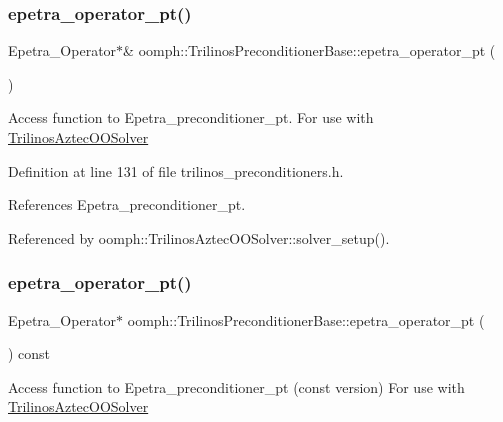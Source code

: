 \subsubsection{\texorpdfstring{epetra\+\_\+operator\+\_\+pt()}{epetra\_operator\_pt()}\hspace{0.1cm}{\footnotesize\ttfamily [1/2]}}
{\footnotesize\ttfamily Epetra\+\_\+\+Operator$\ast$\& oomph\+::\+Trilinos\+Preconditioner\+Base\+::epetra\+\_\+operator\+\_\+pt (\begin{DoxyParamCaption}{ }\end{DoxyParamCaption})\hspace{0.3cm}{\ttfamily [inline]}}

Access function to Epetra\+\_\+preconditioner\+\_\+pt. For use with {\ttfamily \hyperlink{classoomph_1_1TrilinosAztecOOSolver}{Trilinos\+Aztec\+O\+O\+Solver}} 

Definition at line 131 of file trilinos\+\_\+preconditioners.\+h.



References Epetra\+\_\+preconditioner\+\_\+pt.



Referenced by oomph\+::\+Trilinos\+Aztec\+O\+O\+Solver\+::solver\+\_\+setup().

\mbox{\label{classoomph_1_1TrilinosPreconditionerBase_a0ab557cead75e4ad7332680c27098f23}} 
\subsubsection{\texorpdfstring{epetra\+\_\+operator\+\_\+pt()}{epetra\_operator\_pt()}\hspace{0.1cm}{\footnotesize\ttfamily [2/2]}}
{\footnotesize\ttfamily Epetra\+\_\+\+Operator$\ast$ oomph\+::\+Trilinos\+Preconditioner\+Base\+::epetra\+\_\+operator\+\_\+pt (\begin{DoxyParamCaption}{ }\end{DoxyParamCaption}) const\hspace{0.3cm}{\ttfamily [inline]}}

Access function to Epetra\+\_\+preconditioner\+\_\+pt (const version) For use with {\ttfamily \hyperlink{classoomph_1_1TrilinosAztecOOSolver}{Trilinos\+Aztec\+O\+O\+Solver}} 

